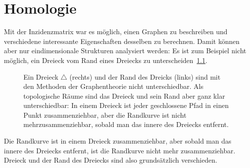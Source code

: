 %
%
%
\chapter{Homologie
\label{buch:chapter:homologie}}
\rhead{}
Mit der Inzidenzmatrix war es möglich, einen Graphen zu beschreiben
und verschiedene interessante Eigenschaften desselben zu berechnen.
Damit können aber nur eindimensionale Strukturen analysiert werden:
Es ist zum Beispiel nicht möglich, ein Dreieck vom Rand eines
Dreiecks zu unterscheiden~\ref{buch:homologie:figure:zusammenziehbar}.
\begin{figure}
\centering
{}
\caption{Ein Dreieck $\triangle$ (rechts) und der Rand des Dreicks
(links) sind mit den Methoden
der Graphentheorie nicht unterschiedbar. 
Als topologische Räume sind das Dreieck und sein Rand aber ganz klar
unterschiedbar: In einem Dreieck ist jeder geschlossene Pfad in einen 
Punkt zusammenziehbar, aber die Randkurve ist nicht mehrzusammenziehbar,
sobald man das innere des Dreiecks entfernt.
\label{buch:homologie:figure:zusammenziehbar}}
\end{figure}
Die Randkurve ist in einem Dreieck zusammenziehbar, aber sobald man
das innere des Dreiecks entfernt, ist die Randkurve nicht mehr
zusammenziehbar.
Dreieck und der Rand des Dreiecks sind also grundsätzlich verschieden.


